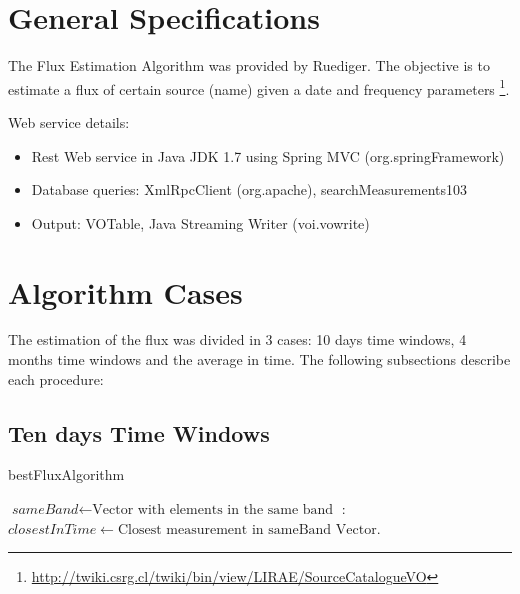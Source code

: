 \documentclass[10pt]{article}
\title{
\center{\emph{Flux Estimation Algorithm} \\}
\author{
        Ruediger Kneissl, Jonathan Antognini\\
}}
\begin{document}
\maketitle

\tableofcontents

\section{General Specifications}

The Flux Estimation Algorithm was provided by Ruediger. The objective is to estimate
a flux of certain source (name) given a date and frequency parameters
\footnote{\url{http://twiki.csrg.cl/twiki/bin/view/LIRAE/SourceCatalogueVO}}.

Web service details:
\begin{itemize}
 \item Rest Web service in Java JDK 1.7 using Spring MVC (org.springFramework)
 \item Database queries: XmlRpcClient (org.apache), searchMeasurements103
 \item Output: VOTable, Java Streaming Writer (voi.vowrite)
\end{itemize}

\section{Algorithm Cases}

The estimation of the flux was divided in 3 cases: 10 days time windows, 4
months time windows and the average in time. The following subsections describe
each procedure:

\subsection{Ten days Time Windows}
\begin{algorithm}
\caption{bestFluxAlgorithm}\label{10days}
\begin{algorithmic}[1]
\State $\textit{sameBand} \gets \text{Vector with elements in the same band}$
: 
\State $closestInTime \gets \text{Closest measurement in sameBand Vector}$.
\Statex
\State {}
\Else
\State {}
\EndIf
\EndProcedure
\end{algorithmic}
\end{algorithm}
\end{document}
